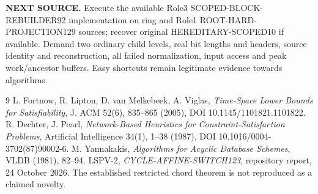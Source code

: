 \documentclass[11pt]{article}
\begin{document}
\textbf{NEXT SOURCE.} Execute the available Role3 SCOPED-BLOCK-REBUILDER92 implementation on ring and Role1 ROOT-HARD-PROJECTION129 sources; recover original HEREDITARY-SCOPED10 if available. Demand two ordinary child levels, real bit lengths and headers, source identity and reconstruction, all failed normalization, input access and peak work/ancestor buffers. Easy shortcuts remain legitimate evidence towards algorithms.

\begin{thebibliography}{9}
 L. Fortnow, R. Lipton, D. van Melkebeek, A. Viglas, \emph{Time-Space Lower Bounds for Satisfiability}, J. ACM 52(6), 835--865 (2005), DOI 10.1145/1101821.1101822.
 R. Dechter, J. Pearl, \emph{Network-Based Heuristics for Constraint-Satisfaction Problems}, Artificial Intelligence 34(1), 1--38 (1987), DOI 10.1016/0004-3702(87)90002-6.
 M. Yannakakis, \emph{Algorithms for Acyclic Database Schemes}, VLDB (1981), 82--94.
 LSPV-2, \emph{CYCLE-AFFINE-SWITCH123}, repository report, 24 October 2026. The established restricted chord theorem is not reproduced as a claimed novelty.
\end{thebibliography}
\end{document}
